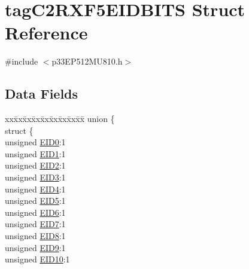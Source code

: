 \hypertarget{structtag_c2_r_x_f5_e_i_d_b_i_t_s}{}\section{tag\+C2\+R\+X\+F5\+E\+I\+D\+B\+I\+TS Struct Reference}
\label{structtag_c2_r_x_f5_e_i_d_b_i_t_s}


{\ttfamily \#include $<$p33\+E\+P512\+M\+U810.\+h$>$}

\subsection*{Data Fields}
\begin{DoxyCompactItemize}
\item 
\begin{tabbing}
xx\=xx\=xx\=xx\=xx\=xx\=xx\=xx\=xx\=\kill
union \{\\
\>struct \{\\
\>\>unsigned \hyperlink{structtag_c2_r_x_f5_e_i_d_b_i_t_s_a9da8b7b30247e4f9cd8cc056549aa9fd}{EID0}:1\\
\>\>unsigned \hyperlink{structtag_c2_r_x_f5_e_i_d_b_i_t_s_afd6c139491d147c1262f3d051c6691e9}{EID1}:1\\
\>\>unsigned \hyperlink{structtag_c2_r_x_f5_e_i_d_b_i_t_s_a36ec62d8d3c5acd5d15e6691dc099a94}{EID2}:1\\
\>\>unsigned \hyperlink{structtag_c2_r_x_f5_e_i_d_b_i_t_s_ab895f7d0ac289a0383b607cbc62eebe2}{EID3}:1\\
\>\>unsigned \hyperlink{structtag_c2_r_x_f5_e_i_d_b_i_t_s_a136d5a709d6618d40acceccb43036656}{EID4}:1\\
\>\>unsigned \hyperlink{structtag_c2_r_x_f5_e_i_d_b_i_t_s_a8dffb2d86a6c184df505ae7c71a58710}{EID5}:1\\
\>\>unsigned \hyperlink{structtag_c2_r_x_f5_e_i_d_b_i_t_s_af8a8574102515d8f1a4b7fd1685d0532}{EID6}:1\\
\>\>unsigned \hyperlink{structtag_c2_r_x_f5_e_i_d_b_i_t_s_a84c3262e67f8d5fd387ac10bde6fa9b1}{EID7}:1\\
\>\>unsigned \hyperlink{structtag_c2_r_x_f5_e_i_d_b_i_t_s_acca25e0b7d86eb499d01f85222baea87}{EID8}:1\\
\>\>unsigned \hyperlink{structtag_c2_r_x_f5_e_i_d_b_i_t_s_ac6748f73d4ada8538b06548be4f396c2}{EID9}:1\\
\>\>unsigned \hyperlink{structtag_c2_r_x_f5_e_i_d_b_i_t_s_a9cea8e77ecbb72bd3b08102412793725}{EID10}:1\\

\end{tabbing}
\end{DoxyCompactItemize}
